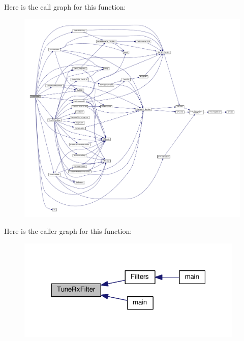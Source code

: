 Here is the call graph for this function\+:
\nopagebreak
\begin{figure}[H]
\begin{center}
\leavevmode
\includegraphics[width=350pt]{d2/da6/lms7002m__filters_8c_a9424d257383be4943c2846bb47253bf3_cgraph}
\end{center}
\end{figure}




Here is the caller graph for this function\+:
\nopagebreak
\begin{figure}[H]
\begin{center}
\leavevmode
\includegraphics[width=307pt]{d2/da6/lms7002m__filters_8c_a9424d257383be4943c2846bb47253bf3_icgraph}
\end{center}
\end{figure}


